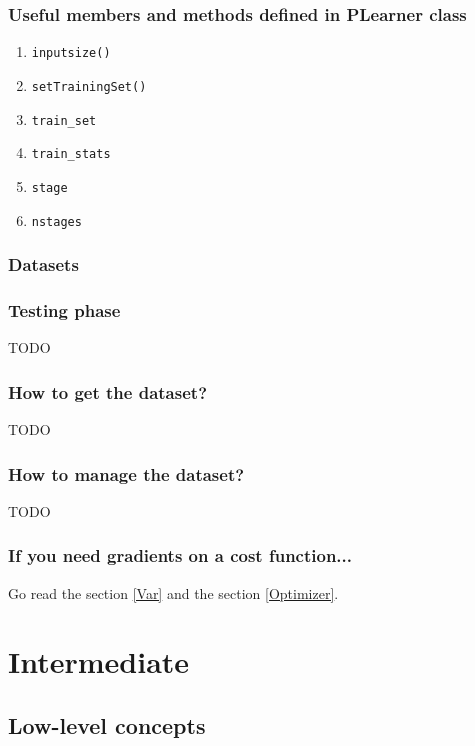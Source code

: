 \documentclass[11pt]{book}
\begin{document}
\subsection{Useful members and methods defined in PLearner class}

\begin{enumerate}
\item {\tt inputsize()}
\item {\tt setTrainingSet()}
\item {\tt train\_set}
\item {\tt train\_stats}
\item {\tt stage}
\item {\tt nstages}
\end{enumerate}

\subsection{\label{plearner_vmat}Datasets}


\subsection{Testing phase}
TODO

\subsection{How to get the dataset?}
TODO

\subsection{How to manage the dataset?}
TODO


\subsection{If you need gradients on a cost function...}

Go read the section \ref{Var} and the section \ref{Optimizer}.

\chapter{Intermediate}

\section{Low-level concepts}
\end{document}
